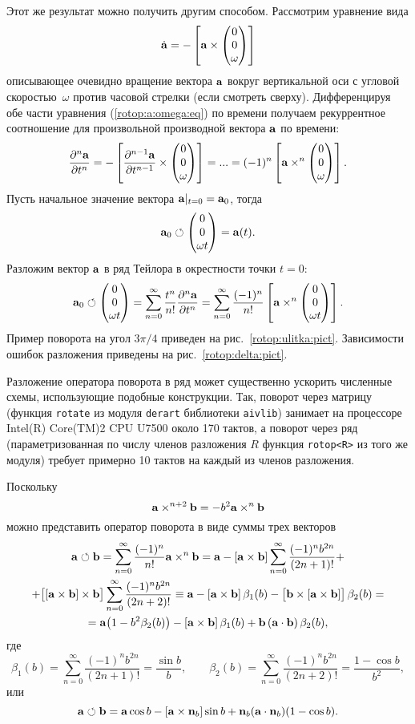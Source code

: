 Этот же результат можно получить другим способом. Рассмотрим уравнение вида
\begin{equation}
\dot\a = -\left[ \a \times \vctr3{0}{0}{\omega} \right] \label{rotop:a:omega:eq}
\end{equation}
описывающее очевидно вращение вектора ${\bf a}$ вокруг вертикальной оси с угловой скоростью~$\omega$ против часовой стрелки (если смотреть сверху). 
Дифференцируя обе части уравнения (\ref{rotop:a:omega:eq}) по времени получаем рекуррентное соотношение для произвольной производной вектора ${\bf a}$ по времени:
$$
\frac{\partial^n\a}{\partial t^n} = -\left[ \frac{\partial^{n-1}\a}{\partial t^{n-1}} \times \vctr3{0}{0}{\omega} \right] = ... 
= (-1)^n \left[ \a \times^n \vctr3{0}{0}{\omega} \right].
$$
Пусть начальное значение вектора ${\bf a}|_{t=0}={\bf a}_0$, тогда
$$
\a_0 \rotop \vctr3{0}{0}{\omega t} = \a(t).
$$
Разложим вектор ${\bf a}$ в ряд Тейлора в окрестности точки $t=0$:
$$
\a_0 \rotop \vctr3{0}{0}{\omega t} = \sum\limits_{n=0}^\infty \frac{t^n}{n!}\frac{\partial^n\a}{\partial t^n} = 
\sum\limits_{n=0}^\infty \frac{(-1)^n}{n!} \left[ \a \times^n \vctr3{0}{0}{\omega t} \right].
$$
Пример поворота на угол $3\pi/4$ приведен на рис.~\ref{rotop:ulitka:pict}.
Зависимости ошибок разложения приведены на рис.~\ref{rotop:delta:pict}.

Разложение оператора поворота в ряд может существенно ускорить численные схемы, использующие подобные конструкции. Так, поворот через матрицу 
(функция \verb'rotate' из модуля \verb'derart' библиотеки \verb'aivlib') занимает на процессоре {\sf Intel(R) Core(TM)2 CPU U7500} около 170 тактов,
а поворот через ряд (параметризованная по числу членов  разложения $R$ функция \verb'rotop<R>' из того же модуля) требует примерно 10 тактов 
на каждый из членов разложения.

Поскольку 
$$
{\bf a}\times^{n+2}{\bf b} = - b^2 {\bf a}\times^n{\bf b} 
$$
можно представить оператор поворота в виде суммы трех векторов
\begin{multline}
{\bf a}\circlearrowleft{\bf b} = \sum\limits_{n=0}^\infty \frac{(-1)^n}{n!} {\bf a}\times^n{\bf b} = 
{\bf a} - [{\bf a}\times{\bf b}] \sum\limits_{n=0}^\infty\frac{(-1)^n b^{2n}}{(2n+1)!} 
+\\+
\big[[{\bf a}\times{\bf b}]\times{\bf b}\big] \sum\limits_{n=0}^\infty\frac{(-1)^n b^{2n}}{(2n+2)!} 
\equiv
{\bf a} - [{\bf a}\times{\bf b}]\,\beta_1(b) - \big[{\bf b}\times[{\bf a}\times{\bf b}]\big]\, \beta_2(b)
=\\= 
{\bf a}\big(1-b^2\beta_2(b)\big) - [{\bf a}\times{\bf b}]\,\beta_1(b) + {\bf b}\,({\bf a}\cdot{\bf b})\,\beta_2(b),
\label{rotop:3v:rotop}
\end{multline}
где
$$
\beta_1(b) = \sum\limits_{n=0}^\infty\frac{(-1)^n b^{2n}}{(2n+1)!} = \frac{\sin b}b ,
\qquad
\beta_2(b) = \sum\limits_{n=0}^\infty\frac{(-1)^n b^{2n}}{(2n+2)!} = \frac{1-\cos b}{b^2},
$$
или
$$
{\bf a}\circlearrowleft{\bf b} = {\bf a} \cos b - [{\bf a}\times{\bf n}_b] \sin b + {\bf n}_b ({\bf a} \cdot {\bf n}_b)(1-\cos b).
$$


